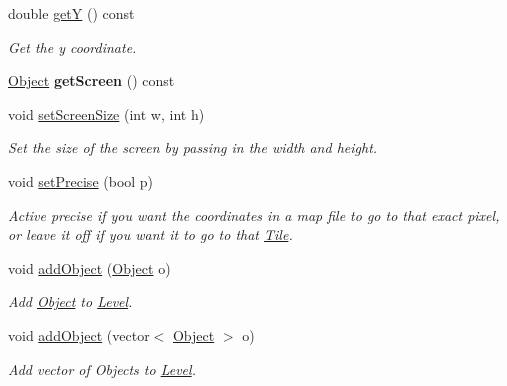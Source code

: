 \begin{DoxyCompactItemize}
\mbox{\label{classLevel_a39f75f6099a7a08e8dc5119bfce853b0}} 
double \hyperlink{classLevel_a39f75f6099a7a08e8dc5119bfce853b0}{getY} () const
\begin{DoxyCompactList}\small\item\em Get the y coordinate. \end{DoxyCompactList}\item 
\mbox{\label{classLevel_ad559b0aa6e81fcc4651cc4c50d4c0c65}} 
\hyperlink{classObject}{Object} {\bfseries get\+Screen} () const
\item 
\mbox{\label{classLevel_a22a202624bb540acc74b678b74b60c9d}} 
void \hyperlink{classLevel_a22a202624bb540acc74b678b74b60c9d}{set\+Screen\+Size} (int w, int h)
\begin{DoxyCompactList}\small\item\em Set the size of the screen by passing in the width and height. \end{DoxyCompactList}\item 
\mbox{\label{classLevel_a6f522671fde4a9d25945a9df651f6e28}} 
void \hyperlink{classLevel_a6f522671fde4a9d25945a9df651f6e28}{set\+Precise} (bool p)
\begin{DoxyCompactList}\small\item\em Active precise if you want the coordinates in a map file to go to that exact pixel, or leave it off if you want it to go to that \hyperlink{classTile}{Tile}. \end{DoxyCompactList}\item 
\mbox{\label{classLevel_a85e4149562c645b6ee11e7a0338dc6d6}} 
void \hyperlink{classLevel_a85e4149562c645b6ee11e7a0338dc6d6}{add\+Object} (\hyperlink{classObject}{Object} o)
\begin{DoxyCompactList}\small\item\em Add \hyperlink{classObject}{Object} to \hyperlink{classLevel}{Level}. \end{DoxyCompactList}\item 
\mbox{\label{classLevel_a227e7b01aecb4cfd14cd54233788dee2}} 
void \hyperlink{classLevel_a227e7b01aecb4cfd14cd54233788dee2}{add\+Object} (vector$<$ \hyperlink{classObject}{Object} $>$ o)
\begin{DoxyCompactList}\small\item\em Add vector of Objects to \hyperlink{classLevel}{Level}. \end{DoxyCompactList}\item 

\end{DoxyCompactItemize}
